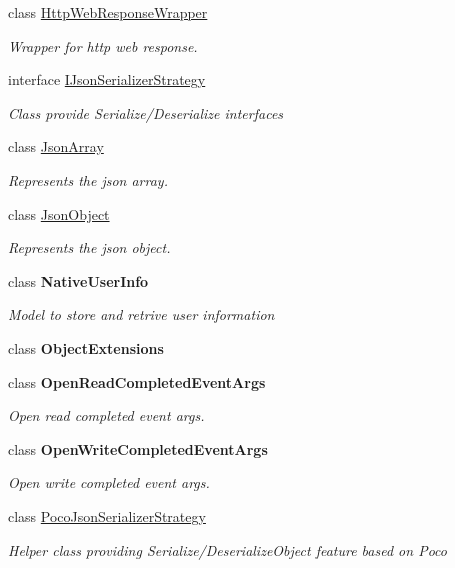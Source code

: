 \begin{DoxyCompactItemize}
class \hyperlink{class_accela_1_1_windows_store_s_d_k_1_1_http_web_response_wrapper}{Http\+Web\+Response\+Wrapper}
\begin{DoxyCompactList}\small\item\em Wrapper for http web response. \end{DoxyCompactList}\item 
interface \hyperlink{interface_accela_1_1_windows_store_s_d_k_1_1_i_json_serializer_strategy}{I\+Json\+Serializer\+Strategy}
\begin{DoxyCompactList}\small\item\em Class provide Serialize/\+Deserialize interfaces \end{DoxyCompactList}\item 
class \hyperlink{class_accela_1_1_windows_store_s_d_k_1_1_json_array}{Json\+Array}
\begin{DoxyCompactList}\small\item\em Represents the json array. \end{DoxyCompactList}\item 
class \hyperlink{class_accela_1_1_windows_store_s_d_k_1_1_json_object}{Json\+Object}
\begin{DoxyCompactList}\small\item\em Represents the json object. \end{DoxyCompactList}\item 
class {\bfseries Native\+User\+Info}
\begin{DoxyCompactList}\small\item\em Model to store and retrive user information \end{DoxyCompactList}\item 
class {\bfseries Object\+Extensions}
\item 
class {\bfseries Open\+Read\+Completed\+Event\+Args}
\begin{DoxyCompactList}\small\item\em Open read completed event args. \end{DoxyCompactList}\item 
class {\bfseries Open\+Write\+Completed\+Event\+Args}
\begin{DoxyCompactList}\small\item\em Open write completed event args. \end{DoxyCompactList}\item 
class \hyperlink{class_accela_1_1_windows_store_s_d_k_1_1_poco_json_serializer_strategy}{Poco\+Json\+Serializer\+Strategy}
\begin{DoxyCompactList}\small\item\em Helper class providing Serialize/\+Deserialize\+Object feature based on Poco \end{DoxyCompactList}\item 

\end{DoxyCompactItemize}
